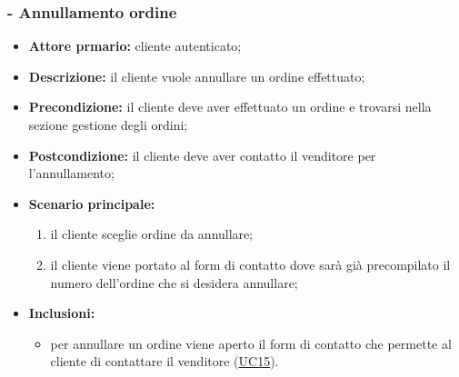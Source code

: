 \subsubsection{ - Annullamento ordine}
\begin{itemize}
    \item \textbf{Attore prmario:} cliente autenticato;
    \item \textbf{Descrizione:} il cliente vuole annullare un ordine effettuato;
    \item \textbf{Precondizione:} il cliente deve aver effettuato un ordine e trovarsi nella sezione gestione degli ordini;
    \item \textbf{Postcondizione:} il cliente deve aver contatto il venditore per l'annullamento;
    \item \textbf{Scenario principale:}
          \begin{enumerate}
              \item il cliente sceglie ordine da annullare;
              \item il cliente viene portato al form di contatto dove sarà già precompilato il numero dell'ordine che si desidera annullare;
          \end{enumerate}
    \item \textbf{Inclusioni:}
          \begin{itemize}
              \item per annullare un ordine viene aperto il form di contatto che permette al cliente di contattare il venditore (\hyperref[UC15]{UC15}).
          \end{itemize}
\end{itemize}

\stepsubUserCase
